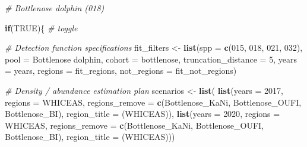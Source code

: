 \documentclass[
]{book}
\newenvironment{Shaded}{\begin{snugshade}}{\end{snugshade}}
\newcommand{\AttributeTok}[1]{\textcolor[rgb]{0.13,0.29,0.53}{#1}}
\newcommand{\CommentTok}[1]{\textcolor[rgb]{0.56,0.35,0.01}{\textit{#1}}}
\newcommand{\ConstantTok}[1]{\textcolor[rgb]{0.56,0.35,0.01}{#1}}
\newcommand{\ControlFlowTok}[1]{\textcolor[rgb]{0.13,0.29,0.53}{\textbf{#1}}}
\newcommand{\DecValTok}[1]{\textcolor[rgb]{0.00,0.00,0.81}{#1}}
\newcommand{\FunctionTok}[1]{\textcolor[rgb]{0.13,0.29,0.53}{\textbf{#1}}}
\newcommand{\NormalTok}[1]{#1}
\newcommand{\OtherTok}[1]{\textcolor[rgb]{0.56,0.35,0.01}{#1}}
\newcommand{\StringTok}[1]{\textcolor[rgb]{0.31,0.60,0.02}{#1}}
\begin{document}
\begin{Shaded}
\begin{Highlighting}[]
\CommentTok{\# Bottlenose dolphin (018)}

\ControlFlowTok{if}\NormalTok{(}\ConstantTok{TRUE}\NormalTok{)\{ }\CommentTok{\# toggle}

  \CommentTok{\# Detection function specifications}
\NormalTok{  fit\_filters }\OtherTok{\textless{}{-}}
    \FunctionTok{list}\NormalTok{(}\AttributeTok{spp =} \FunctionTok{c}\NormalTok{(}\StringTok{\textquotesingle{}015\textquotesingle{}}\NormalTok{, }\StringTok{\textquotesingle{}018\textquotesingle{}}\NormalTok{, }\StringTok{\textquotesingle{}021\textquotesingle{}}\NormalTok{, }\StringTok{\textquotesingle{}032\textquotesingle{}}\NormalTok{),}
         \AttributeTok{pool =} \StringTok{\textquotesingle{}Bottlenose dolphin\textquotesingle{}}\NormalTok{,}
         \AttributeTok{cohort =} \StringTok{\textquotesingle{}bottlenose\textquotesingle{}}\NormalTok{,}
         \AttributeTok{truncation\_distance =} \DecValTok{5}\NormalTok{,}
         \AttributeTok{years =}\NormalTok{ years,}
         \AttributeTok{regions =}\NormalTok{ fit\_regions,}
         \AttributeTok{not\_regions =}\NormalTok{ fit\_not\_regions)}

  \CommentTok{\# Density / abundance estimation plan}
\NormalTok{  scenarios }\OtherTok{\textless{}{-}} \FunctionTok{list}\NormalTok{(}
    \FunctionTok{list}\NormalTok{(}\AttributeTok{years =} \DecValTok{2017}\NormalTok{,}
       \AttributeTok{regions =} \StringTok{\textquotesingle{}WHICEAS\textquotesingle{}}\NormalTok{,}
       \AttributeTok{regions\_remove =} \FunctionTok{c}\NormalTok{(}\StringTok{\textquotesingle{}Bottlenose\_KaNi\textquotesingle{}}\NormalTok{, }\StringTok{\textquotesingle{}Bottlenose\_OUFI\textquotesingle{}}\NormalTok{, }\StringTok{\textquotesingle{}Bottlenose\_BI\textquotesingle{}}\NormalTok{),}
       \AttributeTok{region\_title =} \StringTok{\textquotesingle{}(WHICEAS)\textquotesingle{}}\NormalTok{),}
    \FunctionTok{list}\NormalTok{(}\AttributeTok{years =} \DecValTok{2020}\NormalTok{,}
       \AttributeTok{regions =} \StringTok{\textquotesingle{}WHICEAS\textquotesingle{}}\NormalTok{,}
       \AttributeTok{regions\_remove =} \FunctionTok{c}\NormalTok{(}\StringTok{\textquotesingle{}Bottlenose\_KaNi\textquotesingle{}}\NormalTok{, }\StringTok{\textquotesingle{}Bottlenose\_OUFI\textquotesingle{}}\NormalTok{, }\StringTok{\textquotesingle{}Bottlenose\_BI\textquotesingle{}}\NormalTok{),}
       \AttributeTok{region\_title =} \StringTok{\textquotesingle{}(WHICEAS)\textquotesingle{}}\NormalTok{))}
  

\end{Highlighting}
\end{Shaded}
\end{document}
